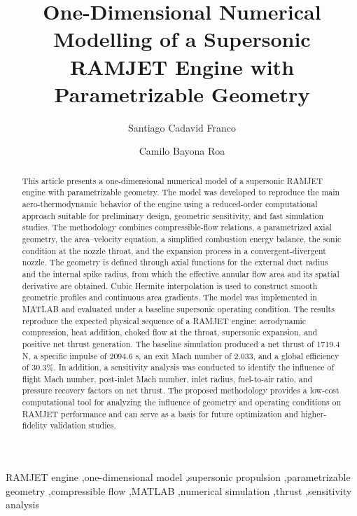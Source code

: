 \documentclass[preprint,12pt]{elsarticle}
\begin{document}
\begin{frontmatter}

\title{One-Dimensional Numerical Modelling of a Supersonic RAMJET Engine with Parametrizable Geometry}

\author[1]{Santiago Cadavid Franco}

\author[1]{Camilo Bayona Roa}


\address[1]{Department of Industrial Engineering, Pontificia Universidad Javeriana, Bogotá, Colombia}

\begin{abstract}
This article presents a one-dimensional numerical model of a supersonic RAMJET engine with parametrizable geometry. The model was developed to reproduce the main aero-thermodynamic behavior of the engine using a reduced-order computational approach suitable for preliminary design, geometric sensitivity, and fast simulation studies. The methodology combines compressible-flow relations, a parametrized axial geometry, the area--velocity equation, a simplified combustion energy balance, the sonic condition at the nozzle throat, and the expansion process in a convergent-divergent nozzle. The geometry is defined through axial functions for the external duct radius and the internal spike radius, from which the effective annular flow area and its spatial derivative are obtained. Cubic Hermite interpolation is used to construct smooth geometric profiles and continuous area gradients. The model was implemented in MATLAB and evaluated under a baseline supersonic operating condition. The results reproduce the expected physical sequence of a RAMJET engine: aerodynamic compression, heat addition, choked flow at the throat, supersonic expansion, and positive net thrust generation. The baseline simulation produced a net thrust of 1719.4 N, a specific impulse of 2094.6 s, an exit Mach number of 2.033, and a global efficiency of 30.3\%. In addition, a sensitivity analysis was conducted to identify the influence of flight Mach number, post-inlet Mach number, inlet radius, fuel-to-air ratio, and pressure recovery factors on net thrust. The proposed methodology provides a low-cost computational tool for analyzing the influence of geometry and operating conditions on RAMJET performance and can serve as a basis for future optimization and higher-fidelity validation studies.
\end{abstract}

\begin{keyword}
RAMJET engine \sep one-dimensional model \sep supersonic propulsion \sep parametrizable geometry \sep compressible flow \sep MATLAB \sep numerical simulation \sep thrust \sep sensitivity analysis
\end{keyword}

\end{frontmatter}
\end{document}
